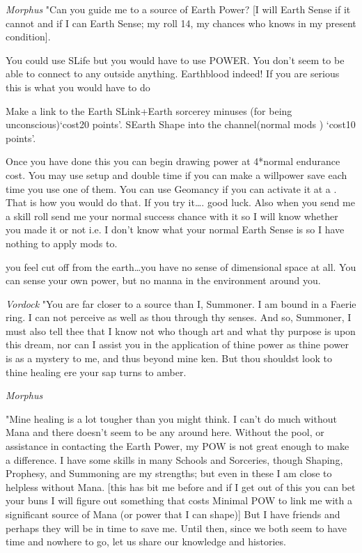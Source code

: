 {\em Morphus}
"Can you guide me to a source of Earth Power?
[I will Earth Sense if it cannot \- and if I can Earth Sense; my roll 
14, my chances \- who knows in my present condition].
{You could use SLife but you would have to use POWER. You don't seem to 
be able to connect to any outside anything. Earthblood indeed! If you 
are serious this is what you would have to do

Make a link to the Earth\-
SLink+Earth sorcerey minuses (for being unconscious)\-`cost20 points'.
SEarth Shape into the channel(normal mods )      \-`cost10 points'.

Once you have done this you can begin drawing power at 4*normal 
endurance cost. You may use set\-up and double time if you can make a 
willpower save each time you use one of them. You can use Geomancy if 
you can activate it at a . That is how you would do that. If you 
try it\dots. good luck. Also when you send me a skill roll send me your 
normal success chance with it so I will know whether you made it or not 
i.e. I don't know what your normal Earth Sense is so I have nothing to 
apply mods to.

{you feel cut off from the earth\dots you have no sense of dimensional 
space at all. You can sense your own power, but no manna in the 
environment around you.}

{\em Vordock}
		"You are far closer to a source than I, Summoner. I am bound 
in a Faerie ring. I can not perceive as well as thou through thy senses. 
And so, Summoner, I must also tell thee that I know not who though art 
and what thy purpose is upon this dream, nor can I assist you in the 
application of thine power as thine power is as a mystery to me, and 
thus beyond mine ken. But thou shouldst look to thine healing ere your 
sap turns to amber.

{\em Morphus}

"Mine healing is a lot tougher than you might think. I can't 
do much without Mana and there doesn't seem to be any around here. 
Without the pool, or assistance in contacting the Earth Power, my POW is 
not great enough to make a difference. I have some skills in many 
Schools and Sorceries, though Shaping, Prophesy, and Summoning are my 
strengths; but even in these I am close to helpless without Mana. [this 
has bit me before and if I get out of this you can bet your buns I will 
figure out something that costs Minimal POW to link me with a 
significant source of Mana (or power that I can shape)]
But I have friends and perhaps they will be in time to save me. Until 
then, since we both seem to have time and nowhere to go, let us share 
our knowledge and histories.

}
